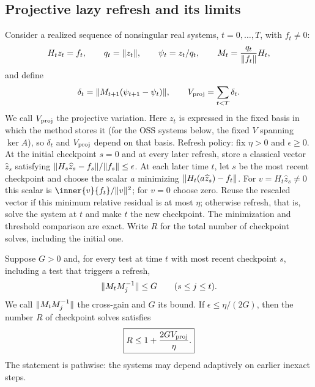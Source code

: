\subsection{Projective lazy refresh and its limits}
\label{sec:positive-lazy}

Consider a realized sequence of nonsingular real systems, $t=0,\ldots,T$,
with $f_t\ne0$:
\begin{equation}
 H_tz_t=f_t,\qquad q_t=\lVert z_t\rVert,\qquad \psi_t=z_t/q_t,
 \qquad M_t=\frac{q_t}{\lVert f_t\rVert}H_t,
 \label{eq:positive-projective-definitions}
\end{equation}
and define
\begin{equation}
 \delta_t=\lVert M_{t+1}(\psi_{t+1}-\psi_t)\rVert,
 \qquad V_{\rm proj}=\sum_{t<T}\delta_t.
 \label{eq:positive-projective-variation}
\end{equation}
We call $V_{\rm proj}$ the projective variation.
Here $z_t$ is expressed in the fixed basis in which the method stores it (for
the OSS systems below, the fixed $V$ spanning $\ker A$), so $\delta_t$ and
$V_{\rm proj}$ depend on that basis.
Refresh policy: fix $\eta>0$ and $\epsilon\geq0$.  At
the initial checkpoint $s=0$ and at every later refresh, store a classical
vector $\widehat z_s$ satisfying
$\lVert H_s\widehat z_s-f_s\rVert/\lVert f_s\rVert\leq\epsilon$.
At each later time $t$, let $s$ be the most recent checkpoint and choose
the scalar $a$ minimizing $\lVert H_t(a\widehat z_s)-f_t\rVert$.
For $v=H_t\widehat z_s\ne0$ this scalar is
$\inner{v}{f_t}/\norm v^2$; for $v=0$ choose zero.
Reuse the rescaled vector if this minimum relative residual is at most
$\eta$; otherwise refresh, that is, solve the system at $t$ and make $t$ the
new checkpoint.  The minimization and threshold comparison are exact.  Write
$R$ for the total number of checkpoint solves, including the initial one.

\begin{theorem}
\label{thm:positive-lazy-refresh}
Suppose $G>0$ and, for every test at time $t$ with most recent checkpoint
$s$, including a test that triggers a refresh,
\begin{equation}
 \lVert M_tM_j^{-1}\rVert\leq G\qquad(s\leq j\leq t).       \label{eq:positive-cross-gain}
\end{equation}
We call $\lVert M_tM_j^{-1}\rVert$ the cross-gain and $G$ its bound.
If $\epsilon\leq\eta/(2G)$, then the number $R$ of checkpoint solves satisfies
\begin{equation}
 \boxed{R\leq1+\frac{2GV_{\rm proj}}{\eta}.}          \label{eq:positive-refresh-count}
\end{equation}
The statement is pathwise: the systems may depend adaptively on earlier
inexact steps.
\end{theorem}

